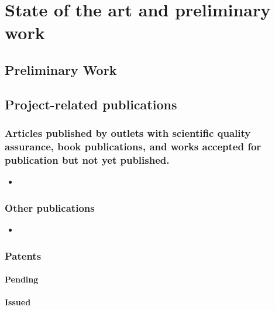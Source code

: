 
\section{State of the art and preliminary work}


\subsection*{Preliminary Work}


\subsection{Project-related publications}


\subsubsection{Articles published by outlets with scientific quality assurance, book publications, and works accepted for publication but not yet published.}
		

		
		\begin{itemize}
		\item 
		\end{itemize}

\subsubsection{Other publications}


\begin{itemize}
\item 
\end{itemize}


\subsubsection{Patents}

	\paragraph{Pending}

	\paragraph{Issued}
